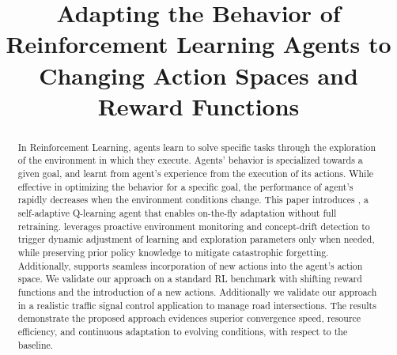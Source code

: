 \documentclass[10pt, conference, ]{IEEEtran}
\begin{document}
\title{Adapting the Behavior of Reinforcement Learning Agents to Changing Action Spaces and Reward Functions}

\author{
}

\maketitle




\begin{abstract}
In Reinforcement Learning, agents learn to solve specific tasks through the exploration of the environment 
in which they execute. Agents' behavior is specialized towards a given goal, and learnt from agent's 
experience from the execution of its actions. While effective in optimizing the behavior for a specific goal, 
the performance of agent's rapidly decreases when the environment conditions change.
This paper introduces \adaptiverl, a self-adaptive Q-learning agent that enables on-the-fly adaptation 
without full retraining. \adaptiverl leverages proactive environment monitoring and concept-drift 
detection to trigger dynamic adjustment of learning and exploration parameters only when needed, 
while preserving prior policy knowledge to mitigate catastrophic forgetting. Additionally, \adaptiverl 
supports seamless incorporation of new actions into the agent’s action space. We validate our approach 
on a standard RL benchmark with shifting reward functions and the introduction of a new actions. 
Additionally we validate our approach in a realistic traffic signal control application to manage road 
intersections. The results demonstrate the proposed approach evidences superior convergence 
speed, resource efficiency, and continuous adaptation to evolving conditions, with respect to the 
baseline.
\end{abstract}
\end{document}

